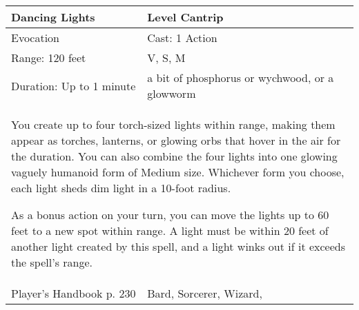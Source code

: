 \documentclass[11pt]{report}
\begin{document}
\begin{table}[H]
	\begin{tabular}{||p{6cm}|p{6cm}||}
		\hline\hline
		\bf{Dancing Lights} & Level Cantrip\\ \hline
		Evocation & Cast: 1 Action\\ \hline
		Range: 120 feet & V, S, M \\ \hline
		Duration: Up to 1 minute & a bit of phosphorus or wychwood, or a glowworm\\ \hline
		\multicolumn{2}{||p{12cm}||}{You create up to four torch-sized lights within range, making them appear as torches, lanterns, or glowing orbs that hover in the air for the duration. 
You can also combine the four lights into one glowing vaguely humanoid form of Medium size. Whichever form you choose, each light sheds dim light in a 10-foot radius. 

As a bonus action on your turn, you can move the lights up to 60 feet to a new spot within range. A light must be within 20 feet of another light created by this spell, and a light winks out if it exceeds the spell’s range.}\\ \hline
Player's Handbook p. 230 & Bard, Sorcerer, Wizard, \\ \hline\hline
	\end{tabular}
\end{table}
\end{document}
